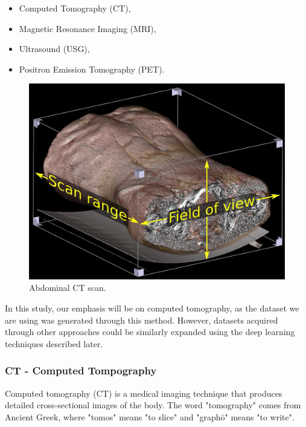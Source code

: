 \begin{itemize}
    \item Computed Tomography (CT),
    \item Magnetic Resonance Imaging (MRI),
    \item Ultrasound (USG),
    \item Positron Emission Tomography (PET).
\end{itemize}

\begin{figure}[H]
    \centering
    \includegraphics[width=0.5\linewidth]{background/1572px-Abdominal_CT_with_scan_range_and_field_of_view,_with_box_and_text.jpg}
    \caption{Abdominal CT scan\cite{abdominal-ct-scan}.}
    \label{fig:ct-scan-abdominal}
\end{figure}

In this study, our emphasis will be on computed tomography, as the dataset we are using was generated through this method. However, datasets acquired through other approaches could be similarly expanded using the deep learning techniques described later.



\newpage
\subsubsection{CT - Computed Tompography}
Computed tomography (CT) is a medical imaging technique that produces detailed cross-sectional images of the body. The word "tomography" comes from Ancient Greek, where "tomos" means "to slice" and "graphō" means "to write". 

